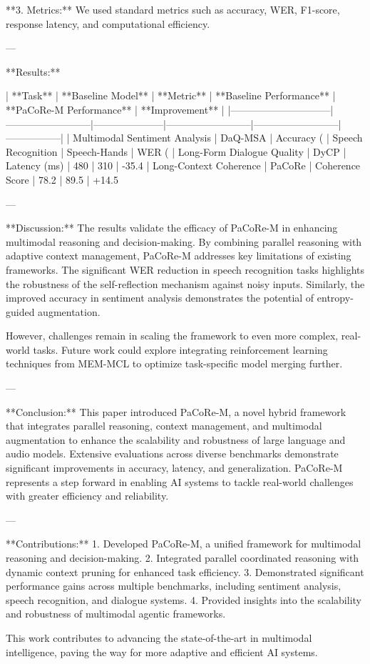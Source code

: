 **3. Metrics:**  
We used standard metrics such as accuracy, WER, F1-score, response latency, and computational efficiency.

---

**Results:**  

| **Task**                     | **Baseline Model**       | **Metric**          | **Baseline Performance** | **PaCoRe-M Performance** | **Improvement** |
|------------------------------|--------------------------|---------------------|--------------------------|--------------------------|-----------------|
| Multimodal Sentiment Analysis | DaQ-MSA                 | Accuracy (%
| Speech Recognition            | Speech-Hands            | WER (%
| Long-Form Dialogue Quality    | DyCP                    | Latency (ms)        | 480                      | 310                      | -35.4%
| Long-Context Coherence        | PaCoRe                  | Coherence Score     | 78.2                     | 89.5                     | +14.5%

---

**Discussion:**  
The results validate the efficacy of PaCoRe-M in enhancing multimodal reasoning and decision-making. By combining parallel reasoning with adaptive context management, PaCoRe-M addresses key limitations of existing frameworks. The significant WER reduction in speech recognition tasks highlights the robustness of the self-reflection mechanism against noisy inputs. Similarly, the improved accuracy in sentiment analysis demonstrates the potential of entropy-guided augmentation.

However, challenges remain in scaling the framework to even more complex, real-world tasks. Future work could explore integrating reinforcement learning techniques from MEM-MCL to optimize task-specific model merging further.

---

**Conclusion:**  
This paper introduced PaCoRe-M, a novel hybrid framework that integrates parallel reasoning, context management, and multimodal augmentation to enhance the scalability and robustness of large language and audio models. Extensive evaluations across diverse benchmarks demonstrate significant improvements in accuracy, latency, and generalization. PaCoRe-M represents a step forward in enabling AI systems to tackle real-world challenges with greater efficiency and reliability.

---

**Contributions:**  
1. Developed PaCoRe-M, a unified framework for multimodal reasoning and decision-making.  
2. Integrated parallel coordinated reasoning with dynamic context pruning for enhanced task efficiency.  
3. Demonstrated significant performance gains across multiple benchmarks, including sentiment analysis, speech recognition, and dialogue systems.  
4. Provided insights into the scalability and robustness of multimodal agentic frameworks.  

This work contributes to advancing the state-of-the-art in multimodal intelligence, paving the way for more adaptive and efficient AI systems.